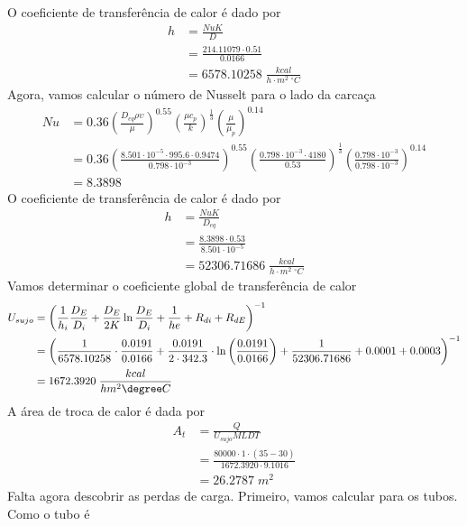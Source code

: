 O coeficiente de transferência de calor é dado por
\begin{align}
    h &= \frac{Nu K}{D}\\
    &= \frac{214.11079 \cdot 0.51}{0.0166}\\
    &= 6578.10258 \; \frac{kcal}{h \cdot m^{2} \; ^{\circ}C}
\end{align}
Agora, vamos calcular o número de Nusselt para o lado da carcaça
\begin{align}
    Nu &= 0.36 \left( \frac{D_{eq} \rho \upsilon }{\mu } \right)^{0.55} \left( \frac{\mu c_{p} }{k} \right)^{\frac{1}{3}} \left( \frac{\mu }{\mu _{p} } \right) ^{0.14}\\
    &= 0.36 \left(\frac{8.501 \cdot 10^{-5} \cdot 995.6 \cdot 0.9474 }{0.798 \cdot 10^{-3}}  \right)^{0.55} \left( \frac{0.798 \cdot 10^{-3} \cdot 4180 }{0.53} \right)^{\frac{1}{3}} \left( \frac{0.798 \cdot 10^{-3} }{0.798 \cdot 10^{-3}} \right) ^{0.14}\\
    &= 8.3898 
\end{align}
O coeficiente de transferência de calor é dado por
\begin{align}
    h &= \frac{Nu K}{D_{eq}}\\
    &= \frac{8.3898 \cdot 0.53}{8.501 \cdot 10^{-5}}\\
    &= 52306.71686 \; \frac{kcal}{h \cdot m^{2} \; ^{\circ}C}
\end{align}
Vamos determinar o coeficiente global de transferência de calor
\begin{align}
    U_{sujo} &= \left( \frac{1}{h_{i} }\frac{D_E}{D_{i} } + \frac{D_E}{2K} \ln \frac{D_E}{D_{i} } + \frac{1}{he} + R_{di} + R_{dE}  \right)^{-1} \\
    &= \left( \frac{1}{6578.10258} \cdot  \frac{0.0191}{0.0166} + \frac{0.0191}{2 \cdot 342.3} \cdot  \ln \left( \frac{0.0191}{0.0166} \right)  + \frac{1}{52306.71686} + 0.0001 + 0.0003  \right)^{-1}\\
    &= 1672.3920 \; \frac{kcal}{h m^{2} \degree C}\\
\end{align}
A área de troca de calor é dada por
\begin{align}
    A_{t} &= \frac{Q}{U_{sujo} MLDT}\\
    &= \frac{80000 \cdot 1 \cdot \left( 35 - 30 \right) }{1672.3920 \cdot 9.1016}\\
    &= 26.2787 \; m^{2}
\end{align} 
Falta agora descobrir as perdas de carga. Primeiro, vamos calcular para os tubos. Como o tubo é
